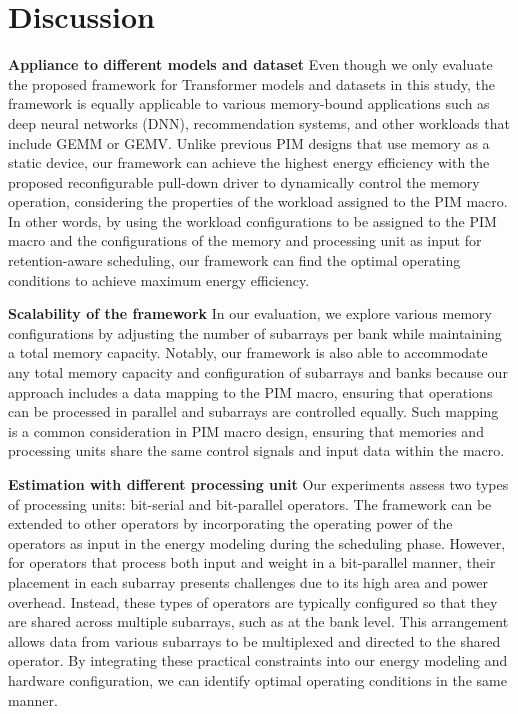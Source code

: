 \section{Discussion}
\label{discussion}

\textbf{Appliance to different models and dataset}
Even though we only evaluate the proposed \sysname framework for Transformer models and datasets in this study, the framework is equally applicable to various memory-bound applications such as deep neural networks (DNN), recommendation systems, and other workloads that include GEMM or GEMV. Unlike previous PIM designs that use memory as a static device, our framework can achieve the highest energy efficiency with the proposed reconfigurable pull-down driver to dynamically control the memory operation, considering the properties of the workload assigned to the PIM macro. In other words, by using the workload configurations to be assigned to the PIM macro and the configurations of the memory and processing unit as input for retention-aware scheduling, our framework can find the optimal operating conditions to achieve maximum energy efficiency.


\textbf{Scalability of the \sysname framework}
In our evaluation, we explore various memory configurations by adjusting the number of subarrays per bank while maintaining a total memory capacity. Notably, our framework is also able to accommodate any total memory capacity and configuration of subarrays and banks because our approach includes a data mapping to the PIM macro, ensuring that operations can be processed in parallel and subarrays are controlled equally. Such mapping is a common consideration in PIM macro design, ensuring that memories and processing units share the same control signals and input data within the macro.


\textbf{Estimation with different processing unit}
Our experiments assess two types of processing units: bit-serial and bit-parallel operators. The \sysname framework can be extended to other operators by incorporating the operating power of the operators as input in the energy modeling during the scheduling phase. However, for operators that process both input and weight in a bit-parallel manner, their placement in each subarray presents challenges due to its high area and power overhead. Instead, these types of operators are typically configured so that they are shared across multiple subarrays, such as at the bank level. This arrangement allows data from various subarrays to be multiplexed and directed to the shared operator. By integrating these practical constraints into our energy modeling and hardware configuration, we can identify optimal operating conditions in the same manner.
